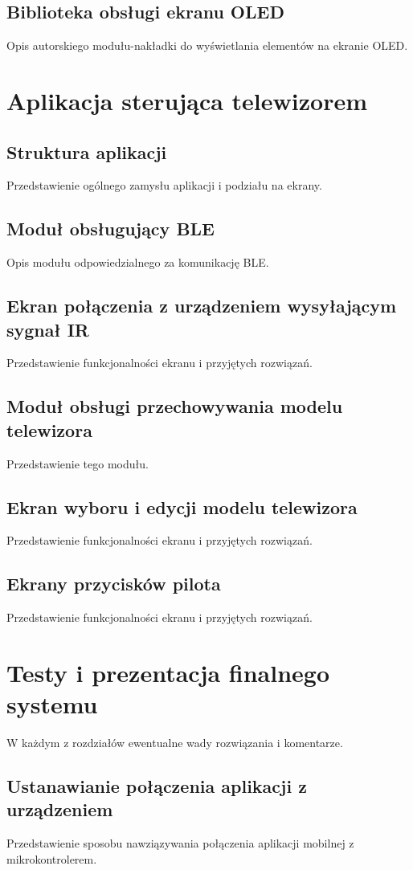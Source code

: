 \documentclass[12pt,twoside]{article}
\begin{document}
\subsection{Biblioteka obsługi ekranu OLED}
Opis autorskiego modułu-nakładki do wyświetlania elementów na ekranie OLED.
\clearpage

\section{Aplikacja sterująca telewizorem}
\subsection{Struktura aplikacji}
Przedstawienie ogólnego zamysłu aplikacji i podziału na ekrany.
\subsection{Moduł obsługujący BLE}
Opis modułu odpowiedzialnego za komunikację BLE.
\subsection{Ekran połączenia z urządzeniem wysyłającym sygnał IR}
Przedstawienie funkcjonalności ekranu i przyjętych rozwiązań.
\subsection{Moduł obsługi przechowywania modelu telewizora}
Przedstawienie tego modułu.
\subsection{Ekran wyboru i edycji modelu telewizora}
Przedstawienie funkcjonalności ekranu i przyjętych rozwiązań.
\subsection{Ekrany przycisków pilota}
Przedstawienie funkcjonalności ekranu i przyjętych rozwiązań.
\clearpage

\section{Testy i prezentacja finalnego systemu}
W każdym z rozdziałów ewentualne wady rozwiązania i komentarze.
\subsection{Ustanawianie połączenia aplikacji z urządzeniem}
Przedstawienie sposobu nawziązywania połączenia aplikacji mobilnej z mikrokontrolerem.
\end{document}
